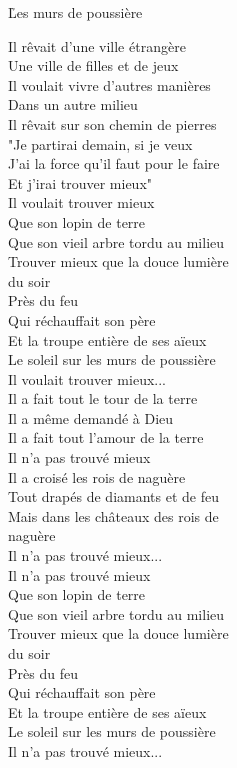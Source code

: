\documentclass{novel}
\begin{document}
\newpage
\normalsize

\h*{Les murs de poussière}
\begin{multicols}{2}
Il rêvait d'une ville étrangère \\
Une ville de filles et de jeux \\
Il voulait vivre d'autres manières \\
Dans un autre milieu \\
Il rêvait sur son chemin de pierres \\
"Je partirai demain, si je veux \\
J'ai la force qu'il faut pour le faire \\
Et j'irai trouver mieux" \\

Il voulait trouver mieux \\
Que son lopin de terre \\
Que son vieil arbre tordu au milieu \\
Trouver mieux que la douce lumière \\
du soir \\
Près du feu \\
Qui réchauffait son père \\
Et la troupe entière de ses aïeux \\
Le soleil sur les murs de poussière \\
Il voulait trouver mieux... \\

Il a fait tout le tour de la terre \\
Il a même demandé à Dieu \\
Il a fait tout l'amour de la terre \\
Il n'a pas trouvé mieux \\
Il a croisé les rois de naguère \\
Tout drapés de diamants et de feu \\
Mais dans les châteaux des rois de \\
naguère \\
Il n'a pas trouvé mieux... \\

Il n’a pas trouvé mieux \\
Que son lopin de terre \\
Que son vieil arbre tordu au milieu \\
Trouver mieux que la douce lumière \\
du soir \\
Près du feu \\
Qui réchauffait son père \\
Et la troupe entière de ses aïeux \\
Le soleil sur les murs de poussière \\
Il n'a pas trouvé mieux... \\


\end{multicols}
\end{document}
